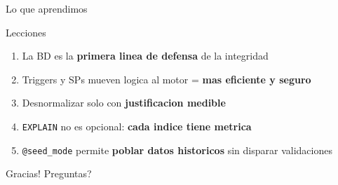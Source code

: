 ﻿\documentclass[11pt,aspectratio=169]{beamer}
\begin{document}
\begin{frame}{Lo que aprendimos}
    \begin{block}{Lecciones}
        \begin{enumerate}
            \item La BD es la \textbf{primera linea de defensa} de la integridad
            \item Triggers y SPs mueven logica al motor = \textbf{mas eficiente y seguro}
            \item Desnormalizar solo con \textbf{justificacion medible}
            \item \texttt{EXPLAIN} no es opcional: \textbf{cada indice tiene metrica}
            \item \texttt{@seed\_mode} permite \textbf{poblar datos historicos} sin disparar validaciones
        \end{enumerate}
    \end{block}
    \vspace{0.5cm}
    \centering
    \Large Gracias! Preguntas?
\end{frame}
\end{document}
